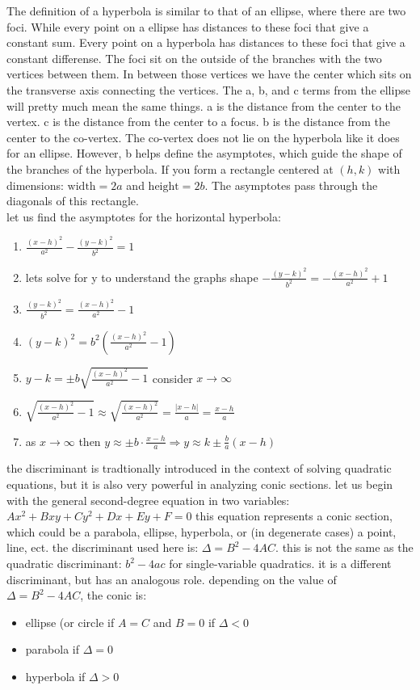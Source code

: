 \documentclass{article}
\begin{document}
The definition of a hyperbola is similar to that of an ellipse, where there are two foci. While every point on a ellipse has distances to these foci that give a constant sum. Every point on a hyperbola has distances to these foci that give a constant differense. The foci sit on the outside of the branches with the two vertices between them. In between those vertices we have the center which sits on the transverse axis connecting the vertices. The a, b, and c terms from the ellipse will pretty much mean the same things. a is the distance from the center to the vertex. c is the distance from the center to a focus. b is the distance from the center to the co-vertex. The co-vertex does not lie on the hyperbola like it does for an ellipse. However, b helps define the asymptotes, which guide the shape of the branches of the hyperbola. If you form a rectangle centered at $(h, k)$ with dimensions: $\text{width} = 2a$ and $\text{height} = 2b$. The asymptotes pass through the diagonals of this rectangle.\\

let us find the asymptotes for the horizontal hyperbola:
	\begin{enumerate}
		\item $\frac{(x - h)^2}{a^2} - \frac{(y - k)^2}{b^2} = 1$ 
		\item lets solve for y to understand the graphs shape $-\frac{(y - k)^2}{b^2} = -\frac{(x - h)^2}{a^2} + 1$ 
		\item $\frac{(y - k)^2}{b^2} = \frac{(x - h)^2}{a^2} - 1$ 
		\item $(y - k)^2 = b^2(\frac{(x - h)^2}{a^2} - 1)$  
		\item $y - k = \pm b \sqrt{\frac{(x - h)^2}{a^2} - 1}$ consider $x \to \infty$ 
		\item $\sqrt{\frac{(x - h)^2}{a^2} - 1} \approx \sqrt{\frac{(x - h)^2}{a^2}} = \frac{\lvert x - h\rvert}{a} = \frac{x - h}{a}$  
		\item as $x \to \infty$ then $y \approx \pm b \cdot \frac{x - h}{a} \Rightarrow y \approx k \pm \frac{b}{a}(x - h)$
	\end{enumerate}

the discriminant is tradtionally introduced in the context of solving quadratic equations, but it is also very powerful in analyzing conic sections. let us begin with the general second-degree equation in two variables: $Ax^2 + Bxy + Cy^2 + Dx + Ey + F = 0$ this equation represents a conic section, which could be a parabola, ellipse, hyperbola, or (in degenerate cases) a point, line, ect. the discriminant used here is: $\Delta = B^2 - 4AC$. this is not the same as the quadratic discriminant: $b^2 - 4ac$ for single-variable quadratics. it is a different discriminant, but has an analogous role. depending on the value of $\Delta = B^2 - 4AC$, the conic is:
	\begin{itemize}
		\item ellipse (or circle if $A = C$ and $B = 0$ if $\Delta < 0$
		\item parabola if $\Delta = 0$
		\item hyperbola if $\Delta > 0$
	\end{itemize}
\end{document}
